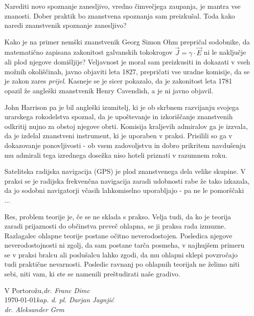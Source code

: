 Narediti novo spoznanje zanesljivo, vredno čimvečjega zaupanja, je mantra vse znanosti. Dober praktik bo znanstvena spoznanja sam preizkušal. Toda kako naredi znanstvenik spoznanje zanesljivo? 

Kako je na primer nemški znanstvenik Georg Simon Ohm prepričal sodobnike, da matematično zapisana zakonitost galvanskih tokokrogov $\vec{J}=\gamma \cdot \vec{E}$ ni le naključje ali plod njegove domišljije? Veljavnost je moral sam preizkusiti in dokazati v vseh možnih okoliščinah, javno objaviti leta 1827, prepričati vse uradne komisije, da se je zakon zares \textit{prijel}. Kasneje se je sicer pokazalo, da je zakonitost leta 1781 opazil že angleški znanstvenik Henry Cavendish, a je ni javno objavil. 

John Harrison pa je bil angleški izumitelj, ki je ob skrbnem razvijanju svojega urarskega rokodelstva spoznal, da je upoštevanje in izkoriščanje znanstvenih odkritij nujno za obstoj njegove obrti. Komisija kraljevih admiralov ga je izzvala, da je izdelal znanstveni instrument, ki je uporaben v praksi. Prisilili so ga v dokazovanje ponovljivosti - ob vsem zadovoljstvu in dobro prikritem navdušenju mu admirali tega izrednega dosežka niso hoteli priznati v razumnem roku. 

Satelitska radijska navigacija (GPS) je plod znanstvenega dela velike skupine. V praksi se je radijska frekvenčna navigacija zaradi udobnosti rabe že tako izkazala, da jo sodobni navigatorji včasih lahkomiselno uporabljajo - pa ne le pomorščaki ...



\vspace{1cm}

Res, problem teorije je, če se ne sklada s prakso. Velja tudi, da ko je teorija zaradi prijaznosti do občinstva preveč ohlapna, se ji praksa rada izmuzne. Razlagalec ohlapne teorije postane očitno neverodostojen. Posledica njegove neverodostojnosti ni zgolj, da sam postane tarča posmeha, v najhujšem primeru se v praksi bralcu ali poslušalcu lahko zgodi, da mu ohlapni sklepi povzročajo tudi praktične nevarnosti. Posledic ravnanj po ohlapnih teorijah ne želimo niti sebi, niti vam, ki ste se namenili preštudirati naše gradivo.


\vspace{1cm}
\begin{flushright}\noindent
V Portorožu,\hfill {\it dr. Franc Dimc}\\
\today \hfill {\it kap. d. pl. Darjan Jagnjić}\\
\hfill {\it dr. Aleksander Grm}\\
\end{flushright}


